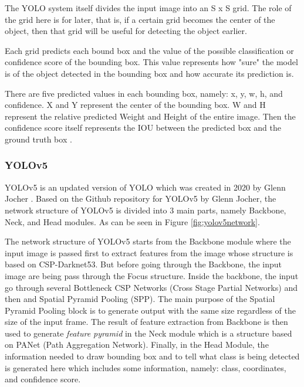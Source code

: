 \par The YOLO system itself divides the input image into an S x S grid. The role of the grid here is for later, that is, if a certain grid becomes the center of the object, then that grid will be useful for detecting the object earlier.

\par Each grid predicts each bound box and the value of the possible classification or confidence score of the bounding box. This value represents how "sure" the model is of the object detected in the bounding box and how accurate its prediction is.

\par There are five predicted values in each bounding box, namely: x, y, w, h, and confidence. X and Y represent the center of the bounding box. W and H represent the relative predicted Weight and Height of the entire image. Then the confidence score itself represents the IOU between the predicted box and the ground truth box \cite{redmon2016you}.

\subsubsection{YOLOv5}
\label{subsecsec:yolov5}

\par YOLOv5 is an updated version of YOLO which was created in 2020 by Glenn Jocher \cite{glenn_jocher_yolov5}. Based on the Github repository for YOLOv5 by Glenn Jocher, the network structure of YOLOv5 is divided into 3 main parts, namely Backbone, Neck, and Head modules. As can be seen in Figure \ref{fig:yolov5network}. 

\par The network structure of YOLOv5 starts from the Backbone module where the input image is passed first to extract features from the image whose structure is based on CSP-Darknet53. But before going through the Backbone, the input image are being pass through the Focus structure. Inside the backbone, the input go through several  Bottleneck CSP Networks (Cross Stage Partial Networks) and then  and Spatial Pyramid Pooling (SPP). The main purpose of the Spatial Pyramid Pooling block is to generate output with the same size regardless of the size of the input frame. The result of feature extraction from Backbone is then used to generate \emph{feature pyramid} in the Neck module which is a structure based on PANet (Path Aggregation Network). Finally, in the Head Module, the information needed to draw bounding box and to tell what class is being detected is generated here which includes some information, namely: class, coordinates, and confidence score.

